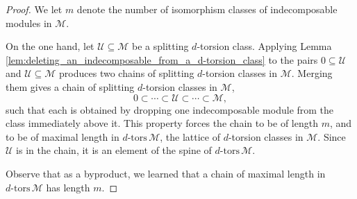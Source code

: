 \documentclass[12pt,reqno]{amsart}
\def\cM{\mathscr{M}}
\def\cU{\mathscr{U}}
\def\dtors{d\mbox{-tors}}
\numberwithin{equation}{section}
\theoremstyle{definition}
\theoremstyle{theorem}
\theoremstyle{definition}
\begin{document}
\begin{proof}
We let $m$ denote the number of isomorphism classes of indecomposable modules in $\cM$.

On the one hand, let $\cU \subseteq \cM$ be a splitting $d$-torsion class.  Applying Lemma \ref{lem:deleting_an_indecomposable_from_a_d-torsion_class} to the pairs $0 \subseteq \cU$ and $\cU \subseteq \cM$ produces two chains of splitting $d$-torsion classes in $\cM\!$.  Merging them gives a chain of splitting $d$-torsion classes in $\cM\!$,
\[
  0 \subset \cdots \subset \cU \subset \cdots \subset \cM\!,
\]
such that each is obtained by dropping one indecomposable module from the class immediately above it.  This property forces the chain to be of length $m$, and to be of maximal length in $\dtors\,\cM\!$, the lattice of $d$-torsion classes in $\cM$.  Since $\cU$ is in the chain, it is an element of the spine of $\dtors\,\cM$.  

Observe that as a byproduct, we learned that a chain of maximal length in $\dtors\,\cM$ has length $m$.


\end{proof}
\end{document}
